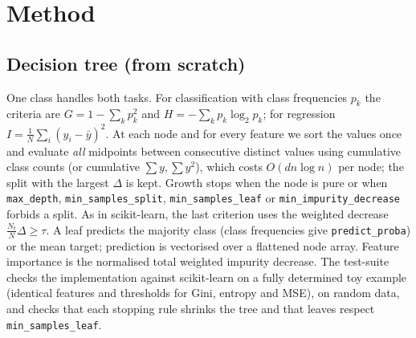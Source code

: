 \documentclass[10pt,twocolumn,a4paper]{article}
\begin{document}
\section{Method}
\subsection{Decision tree (from scratch)}
One class handles both tasks. For classification with class frequencies $p_k$ the criteria are
$G=1-\sum_k p_k^2$ and $H=-\sum_k p_k\log_2 p_k$; for regression $I=\tfrac1{N}\sum_i(y_i-\bar y)^2$.
At each node and for every feature we sort the values once and evaluate \emph{all} midpoints between consecutive distinct values using
cumulative class counts (or cumulative $\sum y,\sum y^2$), which costs $O(dn\log n)$ per node; the split with the largest $\Delta$ is kept.
Growth stops when the node is pure or when \texttt{max\_depth}, \texttt{min\_samples\_split}, \texttt{min\_samples\_leaf}
or \texttt{min\_impurity\_decrease} forbids a split. As in scikit-learn, the last criterion uses the weighted decrease
$\tfrac{N_t}{N}\Delta\ge\tau$. A leaf predicts the majority class (class frequencies give \texttt{predict\_proba}) or the mean target;
prediction is vectorised over a flattened node array. Feature importance is the normalised total weighted impurity decrease.
The test-suite checks the implementation against scikit-learn on a fully determined toy example (identical features and thresholds for Gini, entropy and MSE),
on random data, and checks that each stopping rule shrinks the tree and that leaves respect \texttt{min\_samples\_leaf}.
\end{document}

